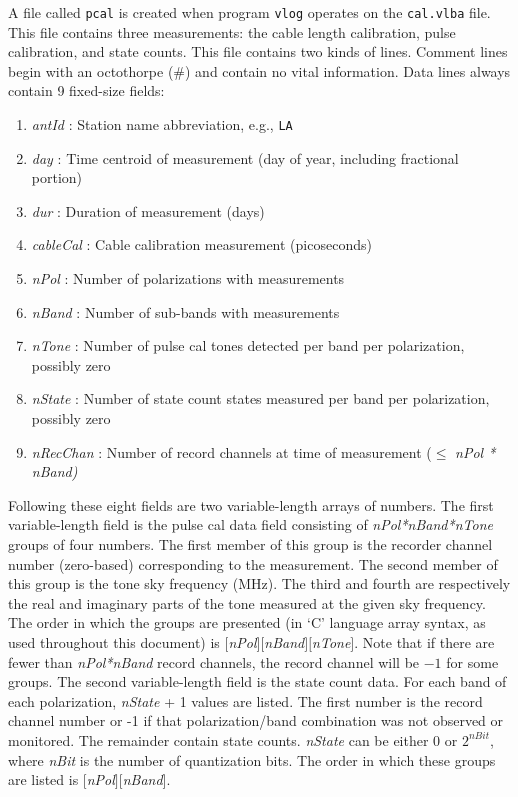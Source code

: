 A file called {\tt pcal} is created when program {\tt vlog} operates on the {\tt cal.vlba} file.
This file contains three measurements: the cable length calibration, pulse calibration, and state counts.
This file contains two kinds of lines.
Comment lines begin with an octothorpe (\#) and contain no vital information.
Data lines always contain 9 fixed-size fields:
\begin{enumerate}
\item {\em antId} : Station name abbreviation, e.g., {\tt LA}
\item {\em day} : Time centroid of measurement (day of year, including fractional portion)
\item {\em dur} : Duration of measurement (days)
\item {\em cableCal} : Cable calibration measurement (picoseconds)
\item {\em nPol} : Number of polarizations with measurements 
\item {\em nBand} : Number of sub-bands with measurements 
\item {\em nTone} : Number of pulse cal tones detected per band per polarization, possibly zero 
\item {\em nState} : Number of state count states measured per band per polarization, possibly zero
\item {\em nRecChan} : Number of record channels at time of measurement ($\le$ \em{nPol * nBand})
\end{enumerate}
Following these eight fields are two variable-length arrays of numbers.
The first variable-length field is the pulse cal data field consisting of {\em nPol*nBand*nTone} groups of four numbers.
The first member of this group is the recorder channel number (zero-based) corresponding to the measurement.
The second member of this group is the tone sky frequency (MHz).
The third and fourth are respectively the real and imaginary parts of the tone measured at the given sky frequency.
The order in which the groups are presented (in `C' language array syntax, as used throughout this document) is $[${\em nPol}$][${\em nBand}$][${\em nTone}$]$.
Note that if there are fewer than {\em nPol*nBand} record channels, the record channel will be $-1$ for some groups.
The second variable-length field is the state count data.
For each band of each polarization, {\em nState} + 1 values are listed.
The first number is the record channel number or -1 if that polarization/band combination was not observed or monitored.
The remainder contain state counts.
{\em nState} can be either 0 or $2^{\mathit nBit}$, where {\em nBit} is the number of quantization bits.
The order in which these groups are listed is $[${\em nPol}$][${\em nBand}$]$.







